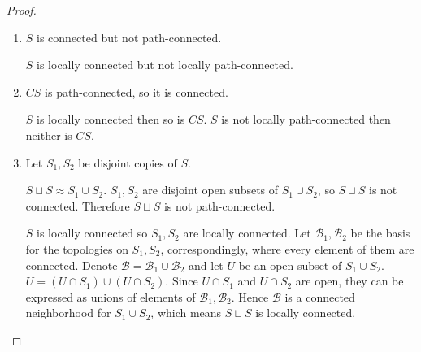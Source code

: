 \begin{proof}
\begin{enumerate}[label={(\alph*)}]
\begin{itemize}
			            This is open in $V$ (with the subspace topology) because
			            \begin{equation*}
				            T_{0} \cup \set{\tuple{x,0} : x < d} \cup \set{\tuple{x, \sin(1/x)} : x < d} = T' \cap (\openinterval{-\infty, d} \times\mathbb{R})
			            \end{equation*}

			            which is open in $T'$.
			      \item $V \cap (\set{\tuple{x,0} : x > d} \cup \set{ \tuple{x, \sin(1/x)} : x > d })$.

			            This is open in $V$ (with the subspace topology) because
			            \begin{equation*}
				            \set{\tuple{x,0} : x > d} \cup \set{\tuple{x, \sin(1/x)} : x > d} = T' \cap (\openinterval{d, \infty} \times\mathbb{R})
			            \end{equation*}

			            which is open in $T'$.
		      \end{itemize}

		      Hence $V$ contains every point $\tuple{d, \sin(1/d)}$ where $0 < d < c$. There exists a positive integer $n$ such that $\frac{1}{2n\pi} < c$, then $\tuple{\frac{1}{2n\pi}, \sin(2n\pi)} = \tuple{\frac{1}{2n\pi}, 0} \in V$. However, this is a contradiction because due to the definition of $U$ (a superset of $V$), every point of $U$ (and so is $V$) has $x$-ordinate greater than 0. Therefore $T'$ is not locally connected.

		      Thus $T\cup X$ is not locally connected, and consequently, it is not locally path-connected.
		\item $S$ is connected but not path-connected.

		      $S$ is locally connected but not locally path-connected.
		\item $CS$ is path-connected, so it is connected.

		      $S$ is locally connected then so is $CS$. $S$ is not locally path-connected then neither is $CS$.
		\item Let $S_{1}, S_{2}$ be disjoint copies of $S$.

		      $S\sqcup S \approx S_{1}\cup S_{2}$. $S_{1}, S_{2}$ are disjoint open subsets of $S_{1}\cup S_{2}$, so $S\sqcup S$ is not connected. Therefore $S\sqcup S$ is not path-connected.

		      $S$ is locally connected so $S_{1}, S_{2}$ are locally connected. Let $\mathscr{B}_{1}, \mathscr{B}_{2}$ be the basis for the topologies on $S_{1}, S_{2}$, correspondingly, where every element of them are connected. Denote $\mathscr{B} = \mathscr{B}_{1} \cup \mathscr{B}_{2}$ and let $U$ be an open subset of $S_{1}\cup S_{2}$. $U = (U\cap S_{1}) \cup (U\cap S_{2})$. Since $U\cap S_{1}$ and $U\cap S_{2}$ are open, they can be expressed as unions of elements of $\mathscr{B}_{1}, \mathscr{B}_{2}$. Hence $\mathscr{B}$ is a connected neighborhood for $S_{1}\cup S_{2}$, which means $S\sqcup S$ is locally connected.


\end{enumerate}
\end{proof}
